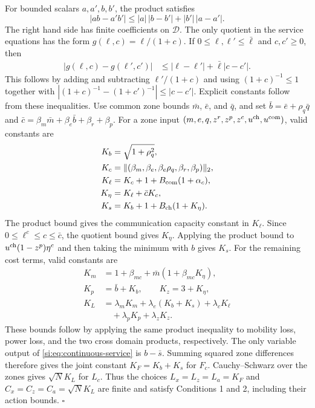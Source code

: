 For bounded scalars $a,a',b,b'$, the product satisfies
\begin{equation}
|ab-a'b'|\le |a|\,|b-b'|+|b'|\,|a-a'|.
\end{equation}
The right hand side has finite coefficients on $\mathcal D$.  The only quotient
in the service equations has the form $g(\ell,c)=\ell/(1+c)$.  If
$0\le\ell,\ell'\le\bar\ell$ and $c,c'\ge0$, then
\begin{align}
|g(\ell,c)-g(\ell',c')|
&\le |\ell-\ell'|
+\bar\ell |c-c'| .
\end{align}
This follows by adding and subtracting $\ell'/(1+c)$ and using
$(1+c)^{-1}\le1$ together with
$|(1+c)^{-1}-(1+c')^{-1}|\le|c-c'|$.
Explicit constants follow from these inequalities.  Use common zone bounds
$\bar m$, $\bar e$, and $\bar q$, and set $\bar b=\bar e+\rho_q\bar q$ and
$\bar c=\beta_m\bar m+\beta_e\bar b+\beta_r+\beta_p$.
For a zone input $(m,e,q,z^r,z^p,z^c,u^{\rm ch},u^{\rm com})$, valid constants are
\begin{align}
K_b&=\sqrt{1+\rho_q^2},\\
K_c&=\|(\beta_m,\beta_e,\beta_e\rho_q,\beta_r,\beta_p)\|_2,\\
K_{\ell}&=K_c+1+B_{\rm com}(1+\alpha_c),\\
K_{\eta}&=K_{\ell}+\bar cK_c,\\
K_s&=K_b+1+B_{\rm ch}(1+K_{\eta}).
\label{si:eq:service-constants}
\end{align}
The product bound gives the communication capacity constant in $K_\ell$.
Since $0\le\ell^c\le c\le\bar c$, the quotient bound gives $K_\eta$.
Applying the product bound to $u^{\rm ch}(1-z^p)\eta^c$ and then taking the
minimum with $b$ gives $K_s$.  For the remaining cost terms, valid constants are
\begin{align}
K_m&=1+\beta_{mc}+\bar m(1+\beta_{mc}K_\eta),\\
K_p&=\bar b+K_b,\qquad K_z=3+K_\eta,\\
K_L&=\lambda_mK_m+\lambda_e(K_b+K_s)+\lambda_cK_\ell
\nonumber\\
&\quad+\lambda_pK_p+\lambda_zK_z.
\label{si:eq:cost-constants}
\end{align}
These bounds follow by applying the same product inequality to mobility loss,
power loss, and the two cross domain products, respectively.
The only variable output of \eqref{si:eq:continuous-service} is $b-\bar s$.
Summing squared zone differences therefore gives the joint constant
$K_F=K_b+K_s$ for $F_c$.  Cauchy--Schwarz over the zones gives
$\sqrt N K_L$ for $L_c$.  Thus the choices
$L_x=L_z=L_a=K_F$ and $C_x=C_z=C_a=\sqrt N K_L$ are finite and satisfy
Conditions 1 and 2, including their action bounds.  \hfill $\square$

